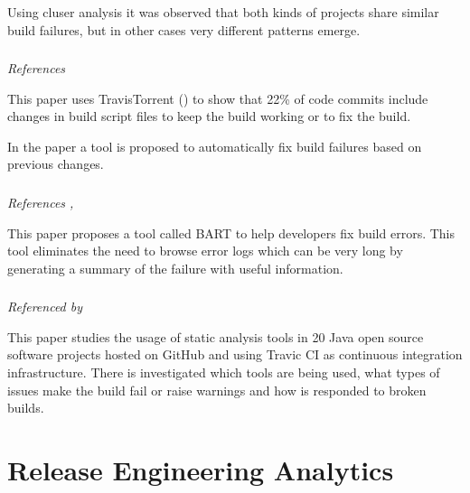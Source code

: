 \documentclass[]{book}
\begin{document}
Using cluser analysis it was observed that both kinds of projects share
similar build failures, but in other cases very different patterns
emerge.

\subsection{\texorpdfstring{\citet{hassan2018hirebuild}}{@hassan2018hirebuild}}\label{hassan2018hirebuild}

\emph{References \citet{beller2017travistorrent} }

This paper uses TravisTorrent (\citet{beller2017travistorrent}) to show
that 22\% of code commits include changes in build script files to keep
the build working or to fix the build.

In the paper a tool is proposed to automatically fix build failures
based on previous changes.

\subsection{\texorpdfstring{\citet{vassallo2018break}}{@vassallo2018break}}\label{vassallo2018break}

\emph{References \citet{beller2017oops}, \citet{rausch2017empirical} }

This paper proposes a tool called \textsc{BART} to help developers fix
build errors. This tool eliminates the need to browse error logs which
can be very long by generating a summary of the failure with useful
information.

\subsection{\texorpdfstring{\citet{zampetti2017open}}{@zampetti2017open}}\label{zampetti2017open}

\emph{Referenced by \citet{vassallo2018break} }

This paper studies the usage of static analysis tools in 20 Java open
source software projects hosted on GitHub and using Travic CI as
continuous integration infrastructure. There is investigated which tools
are being used, what types of issues make the build fail or raise
warnings and how is responded to broken builds.

\chapter{Release Engineering
Analytics}\label{release-engineering-analytics}
\end{document}
